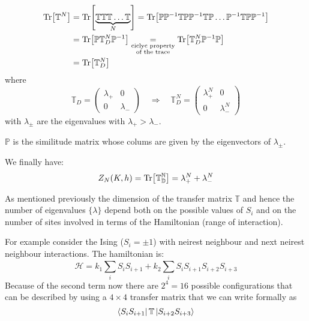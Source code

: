 \documentclass[../main/main.tex]{subfiles}
\begin{document}
\begin{equation}
\begin{split}
  \Tr[\mathbb{T}^N] &= \Tr[\underbrace{\mathbb{T} \mathbb{T} \mathbb{T} \dots \mathbb{T}}_{N} ] = \Tr[ \mathbb{P} \mathbb{P}^{-1} \mathbb{T} \mathbb{P} \mathbb{P}^{-1} \mathbb{T} \mathbb{P} \dots \mathbb{P}^{-1}  \mathbb{T} \mathbb{P} \mathbb{P}^{-1} ]    \\
  & = \Tr[ \mathbb{P} \mathbb{T}_D^N \mathbb{P}^{-1}] \underset{\substack{ \text{ciclyc property} \\  \text{of the trace} } }{=} \Tr[ \mathbb{T}_D^N \mathbb{P}^{-1} \mathbb{P} ]\\
  & = \Tr[ \mathbb{T}_D^N]
\end{split}
\end{equation}
where
\begin{equation}
\mathbb{T}_D =  \begin{pmatrix}
  \lambda _+   & 0 \\
  0   & \lambda _-
  \end{pmatrix}
  \quad \Rightarrow \quad
  \mathbb{T}_D^N =  \begin{pmatrix}
    \lambda _+^N   & 0 \\
    0   & \lambda _-^N
    \end{pmatrix}
\end{equation}
with \( \lambda _{\pm} \) are the eigenvalues with \( \lambda _+ > \lambda _- \).
\begin{remark}
\( \mathbb{P} \) is the similitude matrix whose colums are given by the eigenvectors of \(   \lambda _{\pm} \).
\end{remark}
We finally have:
\begin{equation}
  Z_N (K,h) = \Tr[\mathbb{T_D^N}] = \lambda _+^N  + \lambda _-^N
\end{equation}
\begin{remark}
As mentioned previously the dimension of the transfer matrix \( \mathbb{T} \) and hence the number of eigenvalues \( \{ \lambda  \}   \) depend both on the possible values of \( S_i \) and on the number of sites involved in terms of the Hamiltonian (range of interaction).
\end{remark}
\begin{example}{}{}
For example consider the Ising (\( S_i = \pm 1\)) with neirest neighbour and next neirest neighbour interactions. The hamiltonian is:
\begin{equation}
  \mathcal{H} = k_1 \sum_{i}^{} S_i S_{i+1} + k_2 \sum_{i}^{} S_i S_{i+1} S_{i+2} S_{i+3}
\end{equation}
Because of the second term now there are \( 2^4 = 16 \) possible configurations that can be described by using a \( 4 \times 4 \) transfer matrix that we can write formally as
\begin{equation*}
  \bra{S_i S_{i+1}} \mathbb{T} \ket{S_{i+2} S_{i+3}}
\end{equation*}
\end{example}
\end{document}
